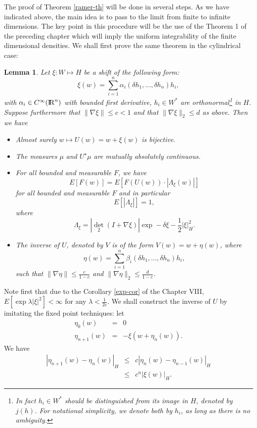 \documentclass[12pt,a4paper]{book}
\newtheorem{lemma}[theorem]{Lemma}
\newcommand{\R}{{\rm I\!R}}
\newcommand{\dett}{{\textstyle{\det_2}}}
\newcommand{\proof}{\noindent {\bf Proof:\ }}
\begin{document}
The proof of  Theorem \ref{ramer-th}  will be done in several steps. As we have
indicated above, the main idea is to pass to the limit from finite to
infinite dimensions. The key point in this procedure will be the use
of the Theorem 1 of the preceding chapter which will imply the
uniform integrability of the finite dimensional densities.
We shall first prove  the same theorem in the  cylindrical case:

\begin{lemma}
\label{lemma1}
Let $\xi:W\mapsto H$ be a shift of the following form:
$$
\xi(w)=\sum_{i=1}^{n}\alpha_i(\delta h_1,\ldots,\delta h_n)h_i,
$$
with $\alpha_i\in C^\infty(\R^n)$ with bounded first derivative,
$h_i\in W^*$ are orthonormal\footnote{In fact
$h_i \in W^*$ should be distinguished from its image in $H$, denoted
by $j(h)$. For notational simplicity, we denote both by $h_i$, as long
as there is no ambiguity.} in $H$. 
Suppose furthermore that $\|\nabla \xi\|\leq c<1$ and that
$\|\nabla\xi \|_2\leq d$ as above. Then we have
\begin{itemize}
\item
Almost surely $w\mapsto U(w) = w + \xi(w)$ is bijective.
\item
The measures
$\mu$ and $ U^{\star}\mu$ are mutually absolutely continuous.
\item For all bounded and measurable $F$, we have
$$
E[F(w)] = E[F(U(w)) \cdot | \Lambda_\xi(w) |]
$$
for all bounded and measurable $F$ and in particular
$$
E[|\Lambda_\xi|] =1,
$$
where
$$
\Lambda_\xi=|\dett(I+\nabla \xi)|\exp-\delta \xi-\frac{1}{2}|\xi|_H^2.
$$
\item The inverse of $U$, denoted by $V$ is of the form $V(w)=w+\eta(w)$,
where $$
\eta(w)=\sum_{i=1}^{n}\beta_i(\delta h_1,\ldots,\delta h_n)h_i,
$$
such that  $\|\nabla \eta\|\leq \frac{c}{1-c}$ and
$\|\nabla\eta \|_2\leq\frac{d}{1-c}$.
\end{itemize}
\end{lemma}
\proof
Note first that due to the Corollary \ref{exp-cor} of the Chapter
VIII, $E[\exp \lambda|\xi|^2]<\infty$ for any $\lambda
<\frac{1}{2c}$. We shall construct the inverse of $U$ by imitating the
fixed point techniques: let
\begin{eqnarray*}
\eta_0(w)&=&0\\
\eta_{n+1}(w)&=&-\xi(w+\eta_n(w)).
\end{eqnarray*}
We have
\begin{eqnarray*}
|\eta_{n+1}(w)-\eta_n(w)|_H&\leq & c|\eta_{n}(w)-\eta_{n-1}(w)|_H\\
                            &\leq & c^n|\xi(w)|_H.
\end{eqnarray*}
\end{document}
